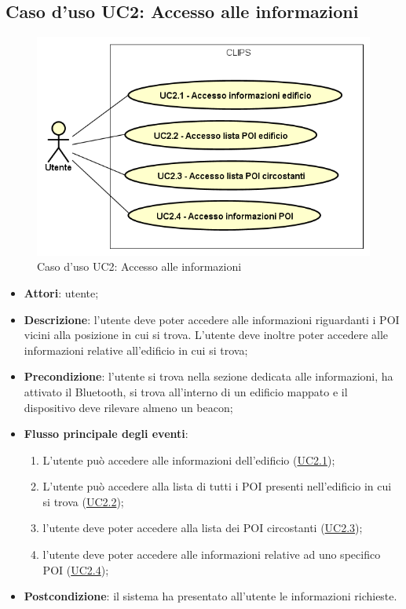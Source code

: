 \documentclass[../AnalisiDeiRequisiti.tex]{subfiles}
\begin{document}
\subsection{Caso d'uso UC2: Accesso alle informazioni}

        \begin{figure}[H]
            \centering
            \includegraphics[scale=0.95, width=\textwidth]{img/UC2.png}
            \caption{Caso d'uso UC2: Accesso alle informazioni}\label{fig:UC2} 
        \end{figure}
\begin{itemize}
\item \textbf{Attori}: utente;
\item \textbf{Descrizione}: l'utente deve poter accedere alle informazioni riguardanti i POI vicini alla posizione in cui si trova. L'utente deve inoltre poter accedere alle informazioni relative all'edificio in cui si trova; 
      \item \textbf{Precondizione}: l'utente si trova nella sezione dedicata alle informazioni, ha attivato il Bluetooth, si trova all'interno di un edificio mappato e il dispositivo deve rilevare almeno un beacon;

        \item \textbf{Flusso principale degli eventi}:
          \begin{enumerate}
          \item L'utente può accedere alle informazioni dell'edificio (\hyperlink{UC2.1}{UC2.1});
          \item L'utente può accedere alla lista di tutti i POI presenti nell'edificio in cui si trova (\hyperlink{UC2.2}{UC2.2});
          \item l'utente deve poter accedere alla lista dei POI circostanti (\hyperlink{UC2.3}{UC2.3});
          \item l'utente deve poter accedere alle informazioni relative ad uno specifico POI (\hyperlink{UC2.4}{UC2.4});

      \end{enumerate}
    \item \textbf{Postcondizione}: il sistema ha presentato all'utente le informazioni richieste.
  \end{itemize}
\hypertarget{UC2.1}{}
\end{document}
